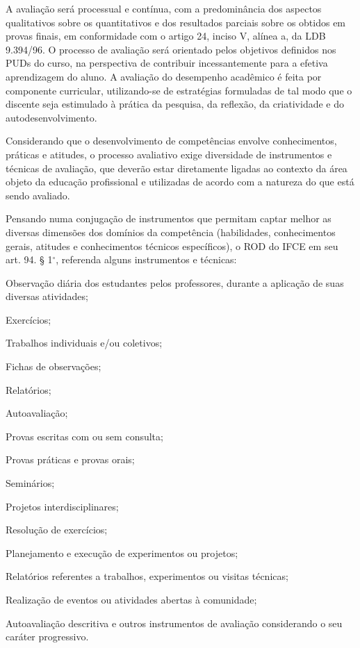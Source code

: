 \documentclass[
	12pt,				%
	openright,			%
	twoside,			%
	a4paper,			%
	chapter=TITLE,		%
	english,			%
	french,				%
	spanish,			%
	brazil,				%
	]{abntex2}
\begin{document}
A avaliação será processual e contínua, com a predominância dos aspectos qualitativos sobre os quantitativos e dos resultados parciais sobre os obtidos em provas finais, em conformidade com o artigo 24, inciso V, alínea a, da LDB 9.394/96. O processo de avaliação será orientado pelos objetivos definidos nos PUDs do curso, na perspectiva de contribuir incessantemente para a efetiva aprendizagem do aluno. A avaliação do desempenho acadêmico é feita por componente curricular, utilizando-se de estratégias formuladas de tal modo que o discente seja estimulado à prática da pesquisa, da reflexão, da criatividade e do autodesenvolvimento.


Considerando que o desenvolvimento de competências envolve conhecimentos, práticas e atitudes, o processo avaliativo exige diversidade de instrumentos e técnicas de avaliação, que deverão estar diretamente ligadas ao contexto da área objeto da educação profissional e utilizadas de acordo com a natureza do que está sendo avaliado.

Pensando numa conjugação de instrumentos que permitam captar melhor as diversas dimensões dos domínios da competência (habilidades, conhecimentos gerais, atitudes e conhecimentos técnicos específicos), o ROD do IFCE em seu art. 94. § 1$^\circ$, referenda alguns instrumentos e técnicas:

\begin{alineas}
\item  Observação diária dos estudantes pelos professores, durante a aplicação de suas diversas atividades;  
\item  Exercícios;
\item Trabalhos individuais e/ou coletivos;
\item Fichas de observações;
\item Relatórios;
\item Autoavaliação;
\item Provas escritas com ou sem consulta;
\item  Provas práticas e provas orais;
\item  Seminários;
\item  Projetos interdisciplinares;
\item Resolução de exercícios;
\item Planejamento e execução de experimentos ou projetos;
\item Relatórios referentes a trabalhos, experimentos ou visitas técnicas;
\item Realização de eventos ou atividades abertas à comunidade;
\item Autoavaliação descritiva e outros instrumentos de avaliação considerando o seu caráter progressivo. 

\end{alineas}
\end{document}
